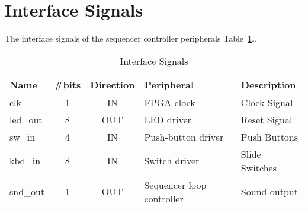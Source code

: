 \section{Interface Signals}
\label{sec:is}

The interface signals of the sequencer controller peripherals Table~\ref{tab:Interface signals}..

\begin{table}[!htbp]
    \centering
    \caption{Interface Signals}
    \label{tab:Interface signals}
    \begin{tabular}{@{}lccll@{}}
    \toprule
    Name     & \multicolumn{1}{l}{\#bits} & \multicolumn{1}{l}{Direction} & Peripheral                & Description    \\ \midrule
    clk      & 1                          & IN                            & FPGA clock                & Clock Signal   \\
    led\_out & 8                          & OUT                           & LED driver                & Reset Signal   \\
    sw\_in   & 4                          & IN                            & Push-button driver        & Push Buttons   \\
    kbd\_in  & 8                          & IN                            & Switch driver             & Slide Switches \\
    snd\_out & 1                          & OUT                           & Sequencer loop controller & Sound output   \\ \bottomrule
    \end{tabular}
    \end{table}

